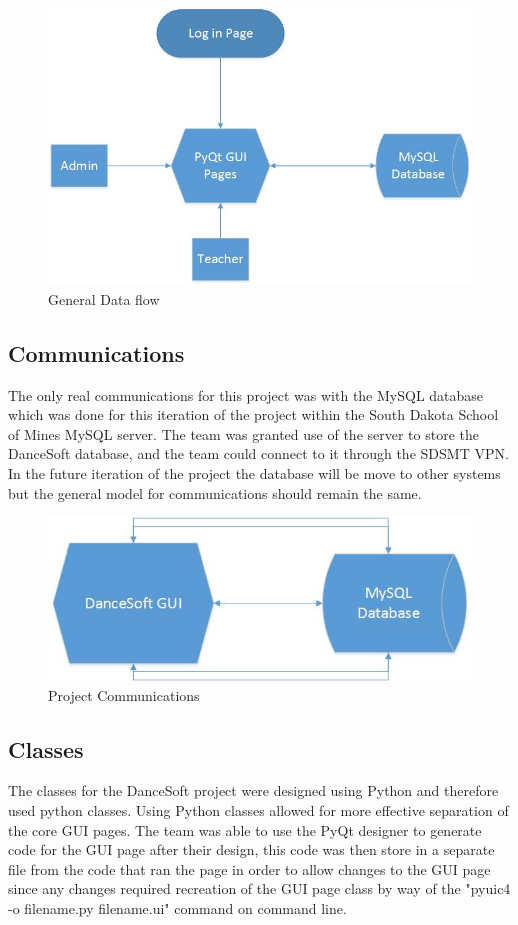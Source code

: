 \begin{figure}
  \includegraphics[width=\linewidth]{pics/Dataflow.jpg}
  \caption{General Data flow}
  \label{fig: General Data flow}
\end{figure}
 
 
\subsection{Communications}
The only real communications for this project was with the MySQL database which was done for this iteration of the project within the South Dakota School of Mines MySQL server. The team was granted use of the server to store the DanceSoft database, and the team could connect to it through the SDSMT VPN. In the future iteration of the project the database will be move to other systems but the general model for communications should remain the same.

\begin{figure}
  \includegraphics[width=\linewidth]{pics/DatabaseComm.jpg}
  \caption{Project Communications}
  \label{fig: Project Communications}
\end{figure}
 
\subsection{Classes}
The classes for the DanceSoft project were designed using Python and therefore used python classes. Using Python classes allowed for more effective separation of the core GUI pages. The team was able to use the PyQt designer to generate code for the GUI page after their design, this code was then store in a separate file from the code that ran the page in order to allow changes to the GUI page since any changes required recreation of the GUI page class by way of the "pyuic4 -o filename.py filename.ui" command on command line. 

